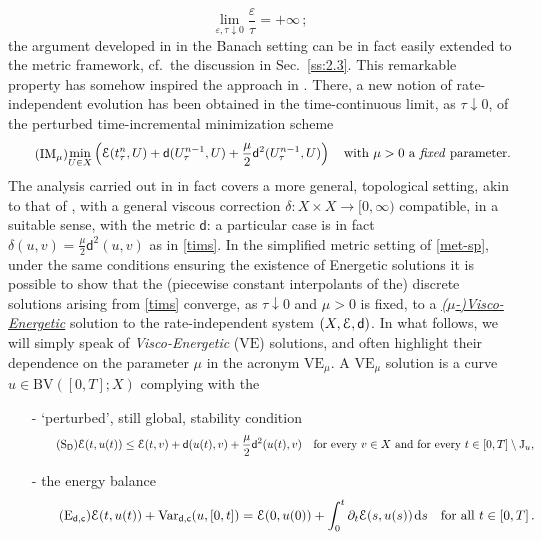 \documentclass[a4paper,10pt,reqno]{amsart} %
\numberwithin{equation}{section}
\newcommand{\down}{\downarrow}
\def\dd{\;\!\mathrm{d}} %
\newcommand{\eps}{\varepsilon}
\newcommand{\Xs}{X}
\newcommand{\BV}{\mathrm{BV}}
\newcommand{\mdn}{\mathsf{d}}
\newcommand{\corn}{\delta}
\newcommand{\md}[2]{\mathsf{d}(#1,#2)}
\newcommand{\ene}[2]{\mathcal{E}(#1,#2)}
\newcommand{\ds}[3]{{#1}_{#2}^{#3}}
\newcommand{\cmdn}{\mathsf{D}}
\newcommand{\corr}[2]{\delta(#1,#2)}
\newcommand{\Vari}[4]{\mathrm{Var}_{#1}(#2,[#3,#4])}
\newcommand{\jump}[1]{\mathrm{J}_{#1}}
\newcommand{\vecostname}{\mathsf{c}}
\newcommand{\RIS}{(\Xs,\calE,\mdn)}
\newcommand{\VE}{\mathrm{VE}}
\newcommand{\VEa}[1]{\mathrm{VE}_{#1}}
\begin{document}
 \begin{equation}
 \label{eps-tau-INTRO}
 \lim_{\eps,\tau \down 0}\frac{\eps}{\tau} = +\infty\,;
 \end{equation}
 the argument developed in  \cite{MRS12, MRS13}  in the Banach setting  can be in fact   easily   extended to the metric framework, cf.\ the discussion in Sec.\ 
 \ref{ss:2.3}.  This remarkable property has somehow inspired the approach in \cite{SavMin16}. There, a new notion of rate-independent evolution has been obtained in the time-continuous limit, as $\tau \down 0$, of the  perturbed
 time-incremental minimization scheme
\begin{equation}
\label{tims}
\tag{$\mathrm{IM}_{\mu}$}
\begin{gathered}
\min_{U\in \Xs} \left( \ene{\ds t  \tau n }{U}+ \md{\ds U\tau{n-1}}{U}  +   \frac{\mu}2 \mdn^2(\ds U\tau{n-1},U)
 \right) \quad \text{with }  \mu>0 \text{ a \emph{fixed} parameter.} 
\end{gathered}
\end{equation}
The analysis carried out in \cite{SavMin16} in fact covers a more general, topological setting,
  akin to that of \cite{MaiMie05EREM}, with a general viscous correction $ \corn: \Xs \times \Xs \to [0,\infty)$ compatible, in a suitable sense, with the metric $\mdn$:   a particular case is in fact $\corr u v =   \tfrac{\mu}2 \mdn^2(u,v)$ as in \eqref{tims}. 
  In the simplified metric setting of \eqref{met-sp}, under the same conditions ensuring the existence of Energetic solutions it is possible to show that the (piecewise constant interpolants of the) discrete solutions arising from \eqref{tims} converge, as $\tau\down 0$ and $\mu>0$ is fixed, to a   \underline{\emph{($\mu$-)Visco-Energetic}}  solution to the rate-independent system $\RIS$. 
  In what follows, we will simply speak of \emph{Visco-Energetic} ($\VE$) solutions, and often  highlight their dependence on the parameter $\mu$ in the acronym $\VEa{\mu}$. 
  A $\VEa{\mu}$ solution  is  a curve $u\in \BV([0,T];\Xs)$ complying with the 
  \begin{itemize}
  \item[-] `perturbed', still global, stability condition
  \begin{equation}
\label{stab-VE-INTRO}
\tag{$\mathrm{S}_{\cmdn}$}
\ene t{u(t)} \leq \ene tv + \md{u(t)}v + \frac\mu2 \mdn^2 (u(t),v)   \quad \text{for every } v \in \Xs \text{ and for every } t \in [0,T]\setminus \jump u,
\end{equation}
\item[-]  the energy balance
\begin{equation}
\label{enbal-VE-INTR0}
\tag{$\mathrm{E}_{\mdn,\vecostname}$}
\ene t{u(t)} + \Vari {\mdn,\vecostname}{u}0{t} = \ene 0{u(0)} +\int_0^t  \partial_t \ene s{u(s)}   \dd s \quad \text{for all } t \in [0,T]\,.
\end{equation}
\end{itemize}
\end{document}

